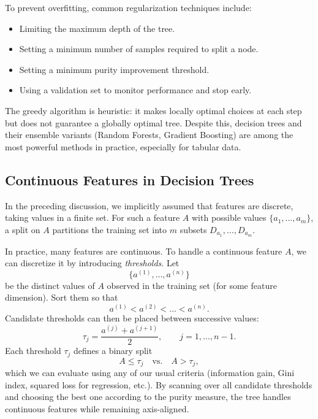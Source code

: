 \documentclass[../main]{subfiles}
\begin{document}
\begin{remark}
    To prevent overfitting, common regularization techniques include:
    \begin{itemize}
        \item Limiting the maximum depth of the tree.
        \item Setting a minimum number of samples required to split a node.
        \item Setting a minimum purity improvement threshold.
        \item Using a validation set to monitor performance and stop early.
    \end{itemize}
\end{remark}

\begin{remark}
    The greedy algorithm is heuristic: it makes locally optimal choices at each step but does not guarantee a globally optimal tree.  Despite this, decision trees and their ensemble variants (Random Forests, Gradient Boosting) are among the most powerful methods in practice, especially for tabular data.
\end{remark}

\subsection{Continuous Features in Decision Trees}

In the preceding discussion, we implicitly assumed that features are discrete,
taking values in a finite set.  For such a feature $A$ with possible values
$\{a_1,\dots,a_m\}$, a split on $A$ partitions the training set into $m$
subsets $D_{a_1},\dots,D_{a_m}$.

In practice, many features are continuous.  To handle a continuous feature $A$,
we can discretize it by introducing \emph{thresholds}.  Let
\begin{equation}
    \{a^{(1)},\dots,a^{(n)}\}
\end{equation}
be the distinct values of $A$ observed in the training set (for some feature
dimension).  Sort them so that
\begin{equation}
    a^{(1)} < a^{(2)} < \dots < a^{(n)}.
\end{equation}
Candidate thresholds can then be placed between successive values:
\begin{equation}
    \tau_j = \frac{a^{(j)} + a^{(j+1)}}{2}, \qquad j=1,\dots,n-1.
\end{equation}
Each threshold $\tau_j$ defines a binary split
\begin{equation}
    A \le \tau_j
    \quad\text{vs.}\quad
    A > \tau_j,
\end{equation}
which we can evaluate using any of our usual criteria (information gain, Gini
index, squared loss for regression, etc.).  By scanning over all candidate
thresholds and choosing the best one according to the purity measure, the tree
handles continuous features while remaining axis-aligned.
\end{document}
